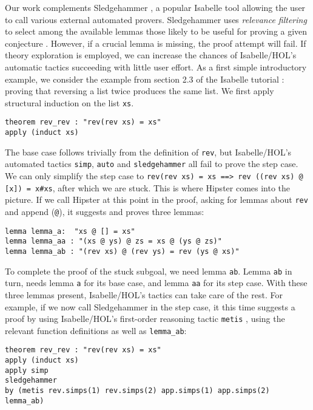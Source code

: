 Our work complements Sledgehammer \cite{sledgehammer}, a popular Isabelle tool allowing the user to call various external automated provers. Sledgehammer uses \emph{relevance filtering} to select among the available lemmas those likely to be useful for proving a given conjecture \cite{mash}. However, if a crucial lemma is missing, the proof attempt will fail. If theory exploration is employed, we can increase the chances of Isabelle/HOL's automatic tactics succeeding with little user effort. As a first simple introductory example, we consider the example from section 2.3 of the Isabelle tutorial \cite{isabelle}: proving that reversing a list twice produces the same list. We first apply structural induction on the list \texttt{xs}.
\begin{verbatim}
theorem rev_rev : "rev(rev xs) = xs"
apply (induct xs)
\end{verbatim}
The base case follows trivially from the definition of \texttt{rev},
but Isabelle/HOL's automated tactics \texttt{simp}, \texttt{auto} and
\texttt{sledgehammer} all fail to prove the step case. We can
only simplify the step case to \texttt{rev(rev
  xs) = xs ==> rev ((rev xs) @ [x]) = x\#xs}, after which we are stuck.
This is where Hipster comes into the picture. If we call Hipster at
this point in the proof, asking for lemmas about \texttt{rev} and
append (\texttt{@}), it suggests and proves three lemmas:
\begin{verbatim}
lemma lemma_a:  "xs @ [] = xs"
lemma lemma_aa : "(xs @ ys) @ zs = xs @ (ys @ zs)"
lemma lemma_ab : "(rev xs) @ (rev ys) = rev (ys @ xs)"
\end{verbatim}

To complete the proof of the stuck subgoal, we need lemma \texttt{ab}. Lemma \texttt{ab} in turn, needs lemma \texttt{a} for its base case, and lemma \texttt{aa} for its step case. With these three lemmas present, Isabelle/HOL's tactics can take care of the rest. For example, if we now call Sledgehammer in the step case, it this time suggests a proof by using Isabelle/HOL's first-order reasoning tactic \texttt{metis} \cite{metis}, using the relevant function definitions as well as \texttt{lemma\_ab}:
\begin{small}
\begin{verbatim}
theorem rev_rev : "rev(rev xs) = xs"
apply (induct xs)
apply simp
sledgehammer
by (metis rev.simps(1) rev.simps(2) app.simps(1) app.simps(2) lemma_ab)
\end{verbatim}
\end{small}
 
